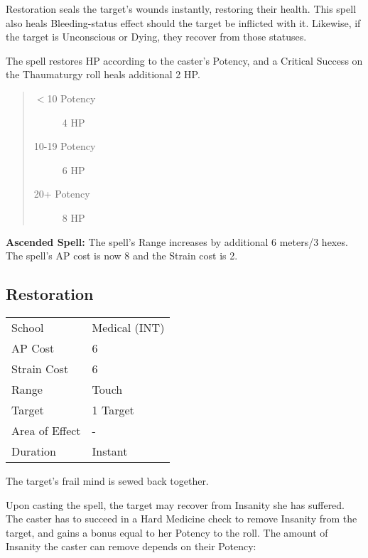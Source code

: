 \documentclass[11pt,a4paper,twocolumn]{book}
\begin{document}
Restoration seals the target's wounds instantly, restoring their health. This spell also heals Bleeding-status effect should the target be inflicted with it. Likewise, if the target is Unconscious or Dying, they recover from those statuses.

The spell restores HP according to the caster's Potency, and a Critical Success on the Thaumaturgy roll heals additional 2 HP.

\begin{quote}
	\begin{description}
		\item[$<$10 Potency] 	4 HP
		\item[10-19 Potency] 	6 HP
		\item[20+ Potency] 	    8 HP	
	\end{description}	
\end{quote}

\bigskip

\textbf{Ascended Spell:} The spell's Range increases by additional 6 meters/3 hexes. The spell's AP cost is now 8 and the Strain cost is 2.

\vfill

\subsection*{Restoration}
{
	\begin{tabu} to 75mm{| X[l,4] | X[l,7] |}
		\hline
		School 			& Medical (INT) 		\\
		AP Cost	      	& 6 					\\
		Strain Cost     & 6 					\\
		Range     		& Touch					\\
		Target      	& 1 Target				\\
		Area of Effect  & -  	 				\\
		Duration     	& Instant				\\ \hline
	\end{tabu}
	
}

\medskip

The target's frail mind is sewed back together.

Upon casting the spell, the target may recover from Insanity she has suffered. The caster has to succeed in a Hard Medicine check to remove Insanity from the target, and gains a bonus equal to her Potency to the roll. The amount of Insanity the caster can remove depends on their Potency:
\end{document}
